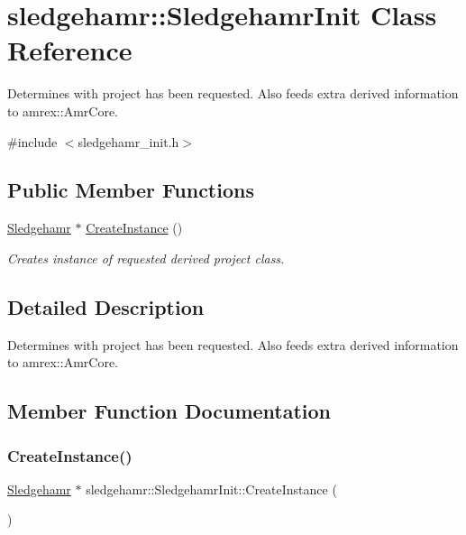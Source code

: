 \hypertarget{classsledgehamr_1_1SledgehamrInit}{}\section{sledgehamr\+:\+:Sledgehamr\+Init Class Reference}
\label{classsledgehamr_1_1SledgehamrInit}


Determines with project has been requested. Also feeds extra derived information to amrex\+::\+Amr\+Core.  




{\ttfamily \#include $<$sledgehamr\+\_\+init.\+h$>$}

\subsection*{Public Member Functions}
\begin{DoxyCompactItemize}
\item 
\mbox{\hyperlink{classsledgehamr_1_1Sledgehamr}{Sledgehamr}} $\ast$ \mbox{\hyperlink{classsledgehamr_1_1SledgehamrInit_a177c4d6ec54f960acea4bfde0c8ccd7c}{Create\+Instance}} ()
\begin{DoxyCompactList}\small\item\em Creates instance of requested derived project class. \end{DoxyCompactList}\end{DoxyCompactItemize}


\subsection{Detailed Description}
Determines with project has been requested. Also feeds extra derived information to amrex\+::\+Amr\+Core. 

\subsection{Member Function Documentation}
\mbox{\label{classsledgehamr_1_1SledgehamrInit_a177c4d6ec54f960acea4bfde0c8ccd7c}} 
\subsubsection{\texorpdfstring{Create\+Instance()}{CreateInstance()}}
{\footnotesize\ttfamily \mbox{\hyperlink{classsledgehamr_1_1Sledgehamr}{Sledgehamr}} $\ast$ sledgehamr\+::\+Sledgehamr\+Init\+::\+Create\+Instance (\begin{DoxyParamCaption}{ }\end{DoxyParamCaption})}



